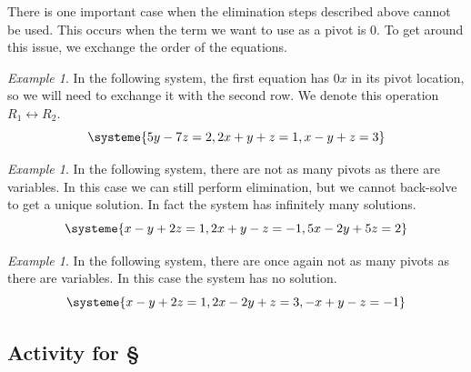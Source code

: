 \documentclass[11pt,oneside]{amsbook}
\theoremstyle{definition}
\theoremstyle{plain}
\theoremstyle{definition}
\theoremstyle{remark}
\newtheorem{example}[theorem]{Example}
\numberwithin{equation}{section}
\numberwithin{figure}{section}
\begin{document}
There is one important case when the elimination steps described above cannot be used. This occurs when the term we want to use as a pivot is $0$. To get around this issue, we exchange the order of the equations.

\begin{example}
  In the following system, the first equation has $0x$ in its pivot location, so we will need to exchange it with the second row. We denote this operation $R_1\leftrightarrow R_2$.
  \[\systeme{5y-7z=2,2x+y+z=1,x-y+z=3}
  \]
\end{example}

\begin{example}
  In the following system, there are not as many pivots as there are variables. In this case we can still perform elimination, but we cannot back-solve to get a unique solution. In fact the system has infinitely many solutions.
  \[\systeme{x-y+2z=1,2x+y-z=-1,5x-2y+5z=2}
  \]
\end{example}

\begin{example}
  In the following system, there are once again not as many pivots as there are variables. In this case the system has no solution.
  \[\systeme{x-y+2z=1,2x-2y+z=3,-x+y-z=-1}
  \]
\end{example}

\newpage
\subsection*{Activity for \S \thesection}
\end{document}
